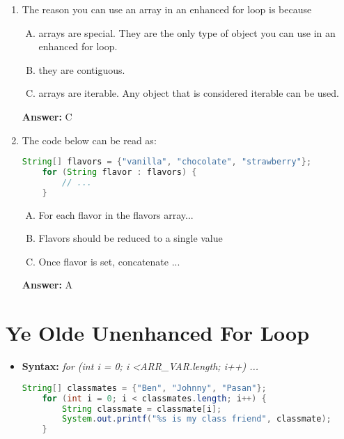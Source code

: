 \documentclass[12pt]{article}
\begin{document}
\begin{enumerate}[1.]
    \item

    The reason you can use an array in an enhanced for loop is because

    \begin{enumerate}[A.]
        \item arrays are special. They are the only type of object you can use in an enhanced for loop.
        \item they are contiguous.
        \item arrays are iterable. Any object that is considered iterable can be used.
    \end{enumerate}

    \bigskip

    \textbf{Answer:} C

    \item

    The code below can be read as:

    \begin{lstlisting}[language=Java]
    String[] flavors = {"vanilla", "chocolate", "strawberry"};
    for (String flavor : flavors) {
        // ...
    }
    \end{lstlisting}

    \bigskip

    \begin{enumerate}[A.]
        \item For each flavor in the flavors array...
        \item Flavors should be reduced to a single value
        \item Once flavor is set, concatenate ...
    \end{enumerate}

    \bigskip

    \textbf{Answer:} A

\end{enumerate}

\bigskip

\section{Ye Olde Unenhanced For Loop}

\bigskip

\begin{itemize}
    \item \textbf{Syntax:} \textit{for (int i = 0; i \textless ARR\_VAR.length; i++) {...}}

    \begin{lstlisting}[language=Java, caption={lesson\_03/Explore.java}]
    String[] classmates = {"Ben", "Johnny", "Pasan"};
    for (int i = 0; i < classmates.length; i++) {
        String classmate = classmate[i];
        System.out.printf("%s is my class friend", classmate);
    }
    \end{lstlisting}
\end{itemize}
\end{document}
